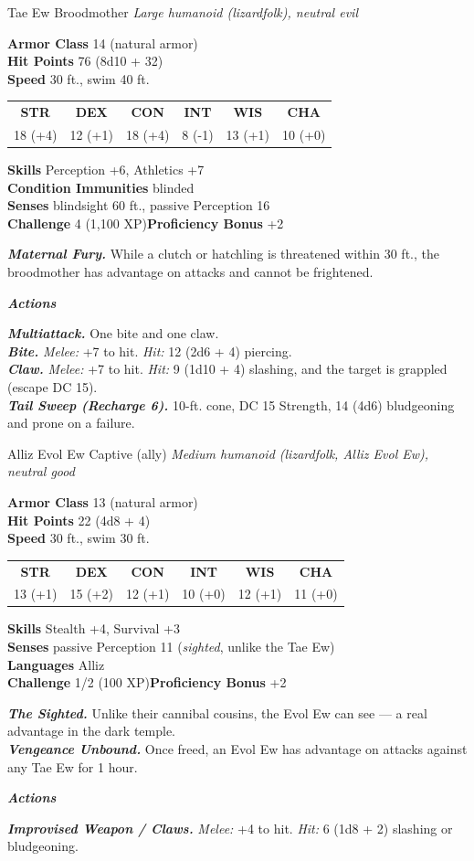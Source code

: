 \documentclass[10pt,twoside]{article}
\newcommand{\abilities}[6]{%
\begin{center}\small
\setlength{\tabcolsep}{6pt}\renewcommand{\arraystretch}{1.05}
\begin{tabular}{cccccc}
\textbf{STR}&\textbf{DEX}&\textbf{CON}&\textbf{INT}&\textbf{WIS}&\textbf{CHA}\\[1pt]
#1&#2&#3&#4&#5&#6\\
\end{tabular}\end{center}}
\newcommand{\sbrule}{\par\vspace{2pt}\noindent{\color{bloodred}\rule{\linewidth}{1.1pt}}\par\vspace{2pt}}
\begin{document}
\begin{statblock}{Tae Ew Broodmother}
\textit{Large humanoid (lizardfolk), neutral evil}\sbrule
\textbf{Armor Class} 14 (natural armor)\\
\textbf{Hit Points} 76 (8d10 + 32)\\
\textbf{Speed} 30 ft., swim 40 ft.\sbrule
\abilities{18 (+4)}{12 (+1)}{18 (+4)}{8 (-1)}{13 (+1)}{10 (+0)}
\sbrule
\textbf{Skills} Perception +6, Athletics +7\\
\textbf{Condition Immunities} blinded\\
\textbf{Senses} blindsight 60 ft., passive Perception 16\\
\textbf{Challenge} 4 (1,100 XP)\hfill\textbf{Proficiency Bonus} +2\sbrule
\textbf{\textit{Maternal Fury.}} While a clutch or hatchling is threatened within 30
ft., the broodmother has advantage on attacks and cannot be frightened.\sbrule
\textit{\textbf{Actions}}\par
\textbf{\textit{Multiattack.}} One bite and one claw.\\
\textbf{\textit{Bite.}} \textit{Melee:} +7 to hit. \textit{Hit:} 12 (2d6 + 4)
piercing.\\
\textbf{\textit{Claw.}} \textit{Melee:} +7 to hit. \textit{Hit:} 9 (1d10 + 4)
slashing, and the target is grappled (escape DC 15).\\
\textbf{\textit{Tail Sweep (Recharge 6).}} 10-ft. cone, DC 15 Strength, 14 (4d6)
bludgeoning and prone on a failure.
\end{statblock}

\begin{statblock}{Alliz Evol Ew Captive \textnormal{(ally)}}
\textit{Medium humanoid (lizardfolk, Alliz Evol Ew), neutral good}\sbrule
\textbf{Armor Class} 13 (natural armor)\\
\textbf{Hit Points} 22 (4d8 + 4)\\
\textbf{Speed} 30 ft., swim 30 ft.\sbrule
\abilities{13 (+1)}{15 (+2)}{12 (+1)}{10 (+0)}{12 (+1)}{11 (+0)}
\sbrule
\textbf{Skills} Stealth +4, Survival +3\\
\textbf{Senses} passive Perception 11 (\emph{sighted}, unlike the Tae Ew)\\
\textbf{Languages} Alliz\\
\textbf{Challenge} 1/2 (100 XP)\hfill\textbf{Proficiency Bonus} +2\sbrule
\textbf{\textit{The Sighted.}} Unlike their cannibal cousins, the Evol Ew can see ---
a real advantage in the dark temple. \\
\textbf{\textit{Vengeance Unbound.}} Once freed, an Evol Ew has advantage on attacks
against any Tae Ew for 1 hour.\sbrule
\textit{\textbf{Actions}}\par
\textbf{\textit{Improvised Weapon / Claws.}} \textit{Melee:} +4 to hit. \textit{Hit:}
6 (1d8 + 2) slashing or bludgeoning.
\end{statblock}
\end{document}
